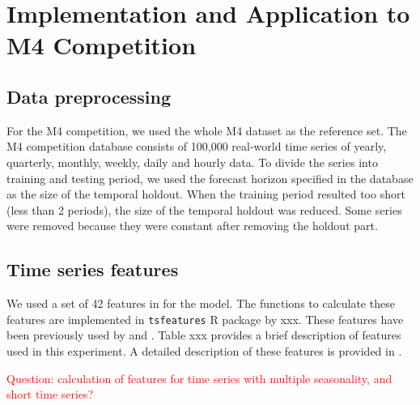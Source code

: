 \documentclass[11pt,a4paper,]{article}
\theoremstyle{definition}
\theoremstyle{definition}
\theoremstyle{definition}
\theoremstyle{remark}
\begin{document}
\section{Implementation and Application to M4
Competition}\label{implementation-and-application-to-m4-competition}

\subsection{Data preprocessing}\label{data-preprocessing}

For the M4 competition, we used the whole M4 dataset as the reference
set. The M4 competition database consists of 100,000 real-world time
series of yearly, quarterly, monthly, weekly, daily and hourly data. To
divide the series into training and testing period, we used the forecast
horizon specified in the database as the size of the temporal holdout.
When the training period resulted too short (less than 2 periods), the
size of the temporal holdout was reduced. Some series were removed
because they were constant after removing the holdout part.

\subsection{Time series features}\label{time-series-features}

We used a set of 42 features in for the model. The functions to
calculate these features are implemented in \texttt{tsfeatures} R
package by xxx. These features have been previously used by
\textcite{fforms} and \textcite{hyndman2015large}. Table xxx provides a
brief description of features used in this experiment. A detailed
description of these features is provided in \textcite{fforms}.

\textcolor{red}{Question: calculation of features for time series with multiple seasonality, and short time series?}
\end{document}
